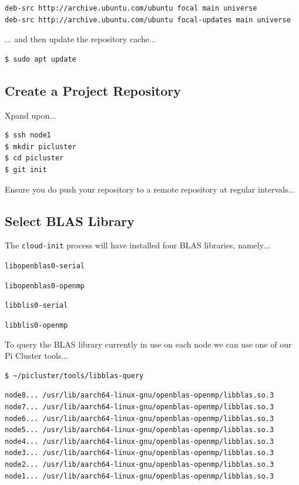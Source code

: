 \documentclass{report}
\begin{document}
\lstset{style=listingstyle}
\begin{lstlisting}[caption=/etc/apt/sources.list.d/picluster.list]
deb-src http://archive.ubuntu.com/ubuntu focal main universe
deb-src http://archive.ubuntu.com/ubuntu focal-updates main universe
\end{lstlisting}

... and then update the repository cache...

\lstset{style=type}
\begin{lstlisting}[]
$ sudo apt update
\end{lstlisting}



\subsection{Create a Project Repository}

Xpand upon...

\lstset{style=type}
\begin{lstlisting}[]
$ ssh node1
$ mkdir picluster
$ cd picluster
$ git init
\end{lstlisting}

Ensure you do push your repository to a remote repository at regular intervals...


\subsection{Select BLAS Library}

The \verb|cloud-init| process will have installed four BLAS libraries, namely...

\verb|libopenblas0-serial|

\verb|libopenblas0-openmp|

\verb|libblis0-serial|

\verb|libblis0-openmp|

To query the BLAS library currently in use on each node we can use one of our Pi Cluster tools...

\lstset{style=type}
\begin{lstlisting}[]
$ ~/picluster/tools/libblas-query
\end{lstlisting}

\lstset{style=type}
\begin{lstlisting}[]
node8... /usr/lib/aarch64-linux-gnu/openblas-openmp/libblas.so.3
node7... /usr/lib/aarch64-linux-gnu/openblas-openmp/libblas.so.3
node6... /usr/lib/aarch64-linux-gnu/openblas-openmp/libblas.so.3
node5... /usr/lib/aarch64-linux-gnu/openblas-openmp/libblas.so.3
node4... /usr/lib/aarch64-linux-gnu/openblas-openmp/libblas.so.3
node3... /usr/lib/aarch64-linux-gnu/openblas-openmp/libblas.so.3
node2... /usr/lib/aarch64-linux-gnu/openblas-openmp/libblas.so.3
node1... /usr/lib/aarch64-linux-gnu/openblas-openmp/libblas.so.3
\end{lstlisting}
\end{document}
